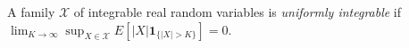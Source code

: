 
A family $\mathcal X$ of integrable real random variables is \emph{uniformly integrable} if $\lim_{K\to\infty}\sup_{X\in\mathcal X}E[|X|\mathbf1_{\{|X|>K\}}]=0$.
